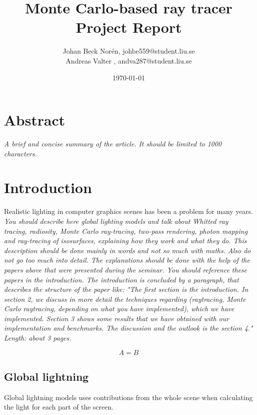 \documentclass[]{report}   %
\begin{document}
\title{Monte Carlo-based ray tracer\\ Project Report}   %
\author{
	Johan Beck Norén, johbe559@student.liu.se
	\\Andreas Valter , andva287@student.liu.se
	}
\date{\today}    %
\maketitle

\setcounter{page}{2}
\chapter{Abstract}
\emph{ A brief and concise summary of the article. It should be limited to 1000 characters.}
\chapter{Introduction}
Realistic lighting in computer graphics scenes has been a problem for many years.
\emph{You should describe here global lighting models and talk about Whitted ray tracing, radiosity, Monte Carlo ray-tracing, two-pass rendering, photon mapping and ray-tracing of isosurfaces, explaining how they work and what they do. 
This description should be done mainly in words and not so much with maths. 
Also do not go too much into detail. 
The explanations should be done with the help of the papers above that were presented during the seminar. 
You should reference these papers in the introduction. 
The introduction is concluded by a paragraph, that describes the structure of the paper like: "The first section is the introduction. 
In section 2, we discuss in more detail the techniques regarding (raytracing, Monte Carlo raytracing, depending on what you have implemented), which we have implemented. 
Section 3 shows some results that we have obtained with our implementation and benchmarks. 
The discussion and the outlook is the section 4." 
Length: about 3 pages.}

\begin{equation} \label{eq:light}
A=B
\end{equation}

\section{Global lightning}
Global lightning models uses contributions from the whole scene when calculating the light for each part of the screen.
\end{document}
